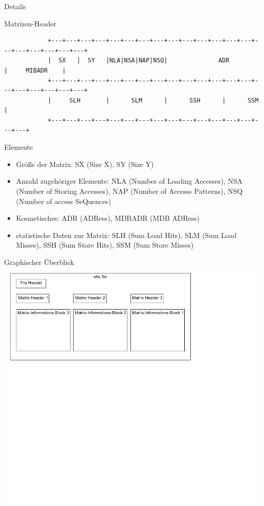 \begin{frame}{Details}
	\begin{block}{Matrizen-Header}
		{\fontsize{6}{6}\selectfont
		\begin{verbatim}
			+---+---+---+---+---+---+---+---+---+---+---+---+---+---+---+---+---+---+---+---+
			|  SX   |  SY   |NLA|NSA|NAP|NSQ|              ADR              |     MIBADR    |
			+---+---+---+---+---+---+---+---+---+---+---+---+---+---+---+---+---+---+---+---+
			|     SLH       |      SLM      |      SSH      |      SSM      |
			+---+---+---+---+---+---+---+---+---+---+---+---+---+---+---+---+
		\end{verbatim}
		}
	\end{block}
	\begin{block}{Elemente}
		\begin{itemize}[<+->]
			\pause
			\item Größe der Matrix: SX (Size X), SY (Size Y)
			\item Anzahl zugehöriger Elemente: NLA (Number of Loading Accesses), NSA (Number of Storing Accesses), NAP (Number of Accesss Patterns), NSQ (Number of access SeQuences)
			\item Kosmetisches: ADR (ADRess), MDBADR (MDB ADRess)
			\item statistische Daten zur Matrix: SLH (Sum Load Hits), SLM (Sum Load Misses), SSH (Sum Store Hits), SSM (Sum Store Misses)
		\end{itemize}
	\end{block}
\end{frame}


\newcommand{\puta}[3]{\begin{picture}(0,0)(0,0)\put(#1,#2){#3}\end{picture}}
\begin{frame}{Graphischer Überblick}
\includegraphics[height=0.95\textheight]{mctracer/dateiaufbau1}
\end{frame}

